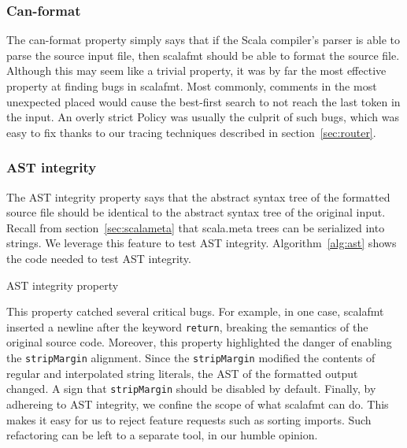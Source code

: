 \subsubsection{Can-format}
The can-format property simply says that if the Scala compiler's parser is able to parse the source input file, then scalafmt should be able to format the source file.
Although this may seem like a trivial property, it was by far the most effective property at finding bugs in scalafmt.
Most commonly, comments in the most unexpected placed would cause the best-first search to not reach the last token in the input.
An overly strict Policy was usually the culprit of such bugs, which was easy to fix thanks to our tracing techniques described in section~\ref{sec:router}.

\subsubsection{AST integrity}
The AST integrity property says that the abstract syntax tree of the formatted source file should be identical to the abstract syntax tree of the original input.
Recall from section~\ref{sec:scalameta} that scala.meta trees can be serialized into strings.
We leverage this feature to test AST integrity.
Algorithm~\ref{alg:ast} shows the code needed to test AST integrity.
\begin{algorithm}
  \caption{AST integrity property}\label{alg:ast}
  
\end{algorithm}
This property catched several critical bugs.
For example, in one case, scalafmt inserted a newline after the keyword \texttt{return}, breaking the semantics of the original source code.
Moreover, this property highlighted the danger of enabling the \texttt{stripMargin} alignment.
Since the \texttt{stripMargin} modified the contents of regular and interpolated string literals,
the AST of the formatted output changed.
A sign that \texttt{stripMargin} should be disabled by default.
Finally, by adhereing to AST integrity, we confine the scope of what scalafmt can do.
This makes it easy for us to reject feature requests such as sorting imports.
Such refactoring can be left to a separate tool, in our humble opinion.

